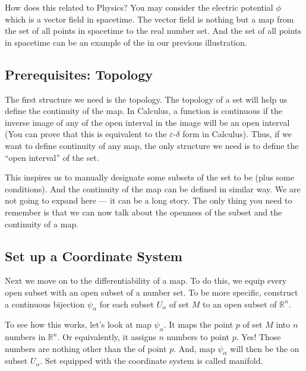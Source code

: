 \documentclass[letterpaper,10pt,english]{sphinxmanual}
\begin{document}
How does this related to Physics? You may consider the electric potential \(\phi\) which is a vector field in spacetime. The vector field is nothing but a map from the set of all points in spacetime to the real number set. And the set of all points in spacetime can be an example of the  in our previous illustration.


\subsection{Prerequisites: Topology}
\label{\detokenize{bg_diff_geo:prerequisites-topology}}
The first structure we need is the topology. The topology of a set will help us define the continuity of the map. In Calculus, a function is continuous if the inverse image of any of the open interval in the image will be an open interval (You can prove that this is equivalent to the \(\varepsilon\)-\(\delta\) form in Calculus). Thus, if we want to define continuity of any map, the only structure we need is to define the “open interval” of the set.

This inspires us to manually designate some subsets of the set to be  (plus some conditions). And the continuity of the map can be defined in similar way. We are not going to expand here — it can be a long story. The only thing you need to remember is that we can now talk about the openness of the subset and the continuity of a map.


\subsection{Set up a Coordinate System}
\label{\detokenize{bg_diff_geo:set-up-a-coordinate-system}}
Next we move on to the differentiability of a map. To do this, we equip every open subset with an open subset of a number set. To be more specific, construct a continuous bijection \(\psi_\alpha\) for each subset \(U_\alpha\) of set \(M\) to an open subset of \(\mathbb R^n\).

To see how this works, let’s look at map \(\psi_\alpha\). It maps the point \(p\) of set \(M\) into \(n\) numbers in \(\mathbb R^n\). Or equivalently, it assigns \(n\) numbers to point \(p\). Yes! Those numbers are nothing other than the  of point \(p\). And, map \(\psi_\alpha\) will then be the  on subset \(U_\alpha\). Set equipped with the coordinate system is called manifold.
\end{document}
